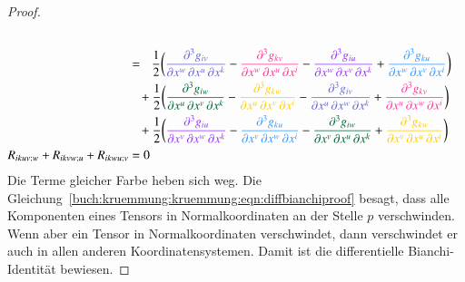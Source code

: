 \begin{proof}
\begin{align}
\notag
\\
&=\phantom{+}
\frac12
\biggl(
{\color{farbeeins}
\frac{\partial^3 g_{iv}}{\partial x^w\,\partial x^u\,\partial x^k}
}
-
{\color{farbezwei}
\frac{\partial^3 g_{kv}}{\partial x^w\,\partial x^u\,\partial x^i}
}
-
{\color{farbedrei}
\frac{\partial^3 g_{iu}}{\partial x^w\,\partial x^v\,\partial x^k}
}
+
{\color{farbevier}
\frac{\partial^3 g_{ku}}{\partial x^w\,\partial x^v\,\partial x^i}
}
\biggr)
\notag
\\
&\phantom{=}\,+
\frac12
\biggl(
{\color{farbefuenf}
\frac{\partial^3 g_{iw}}{\partial x^u\,\partial x^v\,\partial x^k}
}
-
{\color{farbesechs}
\frac{\partial^3 g_{kw}}{\partial x^u\,\partial x^v\,\partial x^i}
}
-
{\color{farbeeins}
\frac{\partial^3 g_{iv}}{\partial x^u\,\partial x^w\,\partial x^k}
}
+
{\color{farbezwei}
\frac{\partial^3 g_{kv}}{\partial x^u\,\partial x^w\,\partial x^i}
}
\biggr)
\notag
\\
&\phantom{=}\,+
\frac12
\biggl(
{\color{farbedrei}
\frac{\partial^3 g_{iu}}{\partial x^v\,\partial x^w\,\partial x^k}
}
-
{\color{farbevier}
\frac{\partial^3 g_{ku}}{\partial x^v\,\partial x^w\,\partial x^i}
}
-
{\color{farbefuenf}
\frac{\partial^3 g_{iw}}{\partial x^v\,\partial x^u\,\partial x^k}
}
+
{\color{farbesechs}
\frac{\partial^3 g_{kw}}{\partial x^v\,\partial x^u\,\partial x^i}
}
\biggr)
\notag
\\
R_{ikuv;w}
+
R_{ikvw;u}
+
R_{ikwu;v}
&=0
\label{buch:kruemmung:kruemmung:eqn:diffbianchiproof}
\end{align}
\egroup
Die Terme gleicher Farbe heben sich weg.
Die Gleichung~\eqref{buch:kruemmung:kruemmung:eqn:diffbianchiproof}
besagt, dass alle Komponenten eines Tensors in Normalkoordinaten
an der Stelle $p$ verschwinden.
Wenn aber ein Tensor in Normalkoordinaten verschwindet, dann 
verschwindet er auch in allen anderen Koordinatensystemen.
Damit ist die differentielle Bianchi-Identität bewiesen.
\end{proof}
